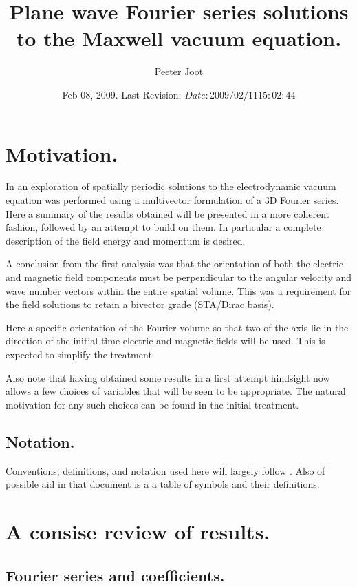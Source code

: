 \documentclass{article}
\title{ Plane wave Fourier series solutions to the Maxwell vacuum equation. }
\author{Peeter Joot}
\date{ Feb 08, 2009.  Last Revision: $Date: 2009/02/11 15:02:44 $ }
\begin{document}
\maketitle{}
\tableofcontents

\section{ Motivation. }

In \cite{PJFourierVacuum} an exploration of spatially periodic solutions to the electrodynamic vacuum equation was performed using a multivector formulation
of a 3D Fourier series.
Here a summary of the results obtained will be presented in a more
coherent fashion, followed by an attempt to build on them.
In particular a complete
description of the field energy and momentum is desired.

A conclusion from the first analysis was that the
orientation of both the electric and magnetic field components
must be perpendicular to the angular velocity and wave number vectors
within the entire spatial volume.  This was a requirement for the field
solutions to retain a bivector grade (STA/Dirac basis).

Here a specific orientation of the Fourier volume so that two of the axis
lie in the direction of the initial time electric and magnetic fields will be
used.  This is expected to simplify the treatment.

Also note that having obtained some results in a first attempt hindsight
now allows a few choices of variables that will be seen to be appropriate.
The natural motivation for any such choices can be found in the initial
treatment.

\subsection{ Notation. }

Conventions, definitions, and notation used here will largely follow
\cite{PJFourierVacuum}.  Also of possible aid in that document is a
a table of symbols and their definitions.

\section{ A consise review of results. }

\subsection{ Fourier series and coefficients. }
\end{document}
